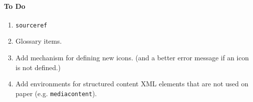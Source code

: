 \documentclass[solutionsatend]{ouunit}
\begin{document}
\paragraph{To Do}
\begin{enumerate}
\item
\verb”sourceref”
\item
Glossary items.
\item
Add mechanism for defining new icons. (and a better error message if an icon is not defined.)
\item
Add environments for structured content XML elements that are not used on paper (e.g. 
\verb"mediacontent").
\end{enumerate}
\printexercisesolutions
\printactivitysolutions
\printindex
\end{document}
